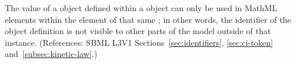 The  value of a \LocalParameter object defined within a
\KineticLaw object can only be used in MathML  elements within
the  element of that same \KineticLaw; in other words, the
identifier of the \LocalParameter object definition is not visible to other
parts of the model outside of that \KineticLaw instance.  (References: SBML
L3V1 Sections~\ref{sec:identifiers}, \ref{sec:ci-token}
and~\ref{subsec:kinetic-law}.)

